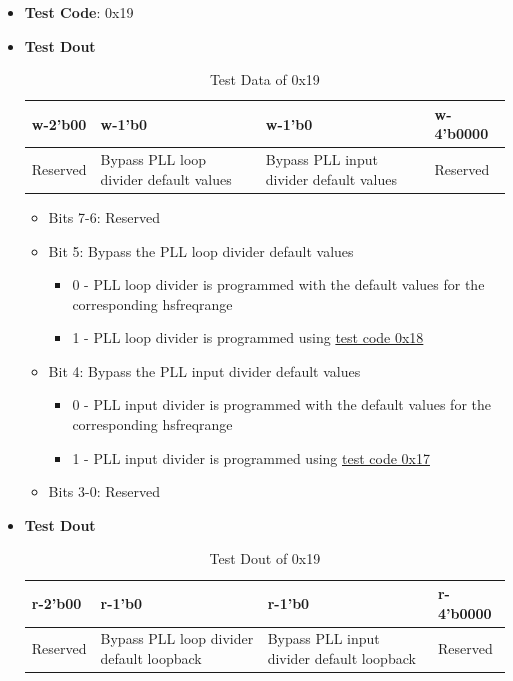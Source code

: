 \documentclass[main\_\_EN.tex]{subfiles}
\begin{document}
\begin{itemize}
    \item \textbf{Test Code}: 0x19
    \item \textbf{Test Dout} 
        \begin{longtable}{ |p{2cm}|p{5cm}|p{5cm}|p{2cm}|}
            \caption{Test Data of 0x19}
            \label{tab:test-data-0x19} \\
            \hline
            \rowcolor{lightgray}
            \textbf{w-2'b00} & \textbf{w-1'b0} & \textbf{w-1'b0} & \textbf{w-4'b0000} \\ \hline
            Reserved & Bypass PLL loop divider default values & Bypass PLL input divider default values & Reserved \\ \hline
        \end{longtable}
        \begin{itemize}
            \item Bits 7-6: Reserved
            \item Bit 5: Bypass the PLL loop divider default values
                \begin{itemize}
                    \item 0 - PLL loop divider is programmed with the default values for the corresponding hsfreqrange
                    \item 1 - PLL loop divider is programmed using \hyperref[sec:test-code-0x18]{test code 0x18}
                \end{itemize}
            \item Bit 4: Bypass the PLL input divider default values
                \begin{itemize}
                    \item 0 - PLL input divider is programmed with the default values for the corresponding hsfreqrange
                    \item 1 - PLL input divider is programmed using \hyperref[sec:test-code-0x17]{test code 0x17}
                \end{itemize}
            \item Bits 3-0: Reserved
        \end{itemize}
    \item \textbf{Test Dout}
        \begin{longtable}{ |p{2cm}|p{5cm}|p{5cm}|p{2cm}|}
            \caption{Test Dout of 0x19}
            \label{tab:test-dout-0x19} \\
            \hline
            \rowcolor{lightgray}
            \textbf{r-2'b00} & \textbf{r-1'b0} & \textbf{r-1'b0} & \textbf{r-4'b0000} \\ \hline
            Reserved & Bypass PLL loop divider default loopback & Bypass PLL input divider default loopback & Reserved \\ \hline
        \end{longtable}
\end{itemize}
\end{document}
